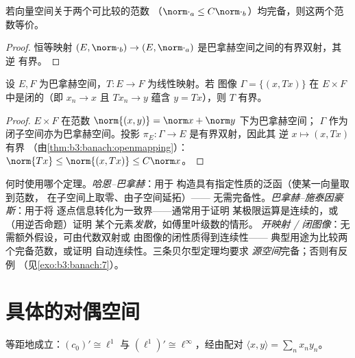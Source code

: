 \begin{corollary}[等价范数]\label{cor:b3:banach:equivnorms}
若向量空间关于两个可比较的范数
（$\norm\cdot_a \leq C\norm\cdot_b$）均完备，则这两个范数等价。
\end{corollary}

\begin{proof}
恒等映射 $(E, \norm\cdot_b) \to (E, \norm\cdot_a)$
是巴拿赫空间之间的有界双射，其逆
有界。
\end{proof}

\begin{theorem}[闭图像定理]\label{thm:b3:banach:closedgraph}
设 $E, F$ 为巴拿赫空间，$T \colon E \to F$ 为线性映射。若
图像 $\Gamma = \{(x, Tx)\}$ 在 $E \times F$ 中是闭的（即
$x_n \to x$ 且 $Tx_n \to y$ 蕴含 $y = Tx$），则 $T$
有界。
\end{theorem}

\begin{proof}
$E \times F$ 在范数 $\norm{(x,y)} = \norm x + \norm y$ 下为巴拿赫空间；
$\Gamma$ 作为闭子空间亦为巴拿赫空间。投影
$\pi_E\colon \Gamma \to E$ 是有界双射，因此其
逆 $x \mapsto (x, Tx)$ 有界
（由\cref{thm:b3:banach:openmapping}）：$\norm{Tx} \leq \norm{(x,
Tx)} \leq C\norm x$。
\end{proof}

\begin{method}\label{met:b3:banach:trilogy}
何时使用哪个定理。\emph{哈恩--巴拿赫}：用于
构造具有指定性质的泛函（使某一向量取到范数，
在子空间上取零、由子空间延拓）——
无需完备性。\emph{巴拿赫--施泰因豪斯}：用于将
逐点信息转化为一致界——通常用于证明
某极限运算是连续的，或（用逆否命题）证明
某个元素\emph{发散}，如傅里叶级数的情形。
\emph{开映射 / 闭图像}：无需额外假设，可由代数双射或
由图像的闭性质得到连续性——
典型用途为比较两个完备范数，或证明
自动连续性。三条贝尔型定理均要求
\emph{源空间}完备；否则有反例
（见\cref{exo:b3:banach:7}）。
\end{method}

\section{具体的对偶空间}

\begin{theorem}\label{thm:b3:banach:duals}
等距地成立：$(c_0)' \cong \ell^1$ 与 $(\ell^1)' \cong
\ell^\infty$，经由配对 $\langle x, y\rangle = \sum_n
x_ny_n$。
\end{theorem}

